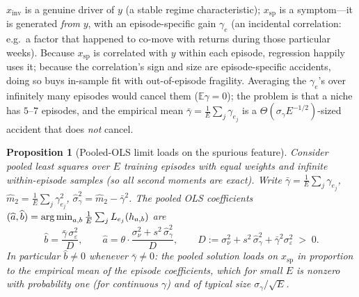 \documentclass[11pt,a4paper]{article}
\theoremstyle{definition}
\theoremstyle{plain}
\newtheorem{proposition}{Proposition}[section]
\newcommand{\E}{\mathbb{E}}
\newcommand{\argmin}{\operatornamewithlimits{arg\,min}}
\begin{document}
\begin{intuition}
$x_{\mathrm{inv}}$ is a genuine driver of $y$ (a stable regime
characteristic); $x_{\mathrm{sp}}$ is a symptom---it is generated \emph{from}
$y$, with an episode-specific gain $\gamma_e$ (an incidental correlation:
e.g.\ a factor that happened to co-move with returns during those particular
weeks). Because $x_{\mathrm{sp}}$ is correlated with $y$ within each episode,
regression happily uses it; because the correlation's sign and size are
episode-specific accidents, doing so buys in-sample fit with out-of-episode
fragility. Averaging the $\gamma_e$'s over infinitely many episodes would
cancel them ($\E\gamma = 0$); the problem is that a niche has $5$--$7$
episodes, and the empirical mean $\bar{\gamma} = \frac{1}{E}\sum_j
\gamma_{e_j}$ is a $\Theta(\sigma_\gamma E^{-1/2})$-sized accident that does
\emph{not} cancel.
\end{intuition}

\begin{proposition}[Pooled-OLS limit loads on the spurious feature]
\label{prop:dd1-pooled-ols}
Consider pooled least squares over $E$ training episodes with equal weights
and infinite within-episode samples (so all second moments are exact). Write
$\bar{\gamma} = \frac{1}{E}\sum_{j} \gamma_{e_j}$,
$\widehat{m}_2 = \frac{1}{E}\sum_j \gamma_{e_j}^2$,
$\widehat{\sigma}_\gamma^2 = \widehat{m}_2 - \bar{\gamma}^2$. The pooled OLS
coefficients $(\widehat{a}, \widehat{b}) = \argmin_{a, b} \frac{1}{E}
\sum_j L_{e_j}(h_{a,b})$ are
\begin{equation}
\label{eq:dd1-pooled-limit}
\widehat{b}
= \frac{\bar{\gamma}\, \sigma_\varepsilon^2}{D},
\qquad
\widehat{a}
= \theta \cdot \frac{\sigma_\nu^2 + s^2\, \widehat{\sigma}_\gamma^2}{D},
\qquad
D := \sigma_\nu^2 + s^2\, \widehat{\sigma}_\gamma^2
+ \bar{\gamma}^2 \sigma_\varepsilon^2 \;>\; 0.
\end{equation}
In particular $\widehat{b} \neq 0$ whenever $\bar{\gamma} \neq 0$: the pooled
solution loads on $x_{\mathrm{sp}}$ \emph{in proportion to the empirical mean
of the episode coefficients}, which for small $E$ is nonzero with
probability one (for continuous $\gamma$) and of typical size
$\sigma_\gamma / \sqrt{E}$.
\end{proposition}
\end{document}

